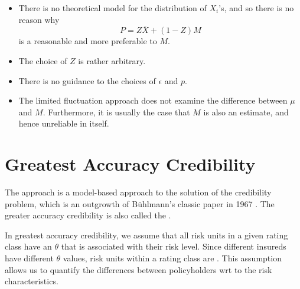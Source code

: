 \documentclass[notoc,notitlepage]{tufte-book}
\begin{document}
\begin{itemize}
  \item There is no theoretical model for the distribution of $X_i$'s, and so
    there is no reason why
    \begin{equation*}
      P = Z \overline{X} + (1 - Z) M
    \end{equation*}
    is a reasonable and more preferable to $M$.
  \item The choice of $Z$ is rather arbitrary.
  \item There is no guidance to the choices of $\epsilon$ and $p$.
  \item The limited fluctuation approach does not examine the difference between
    $\mu$ and $M$. Furthermore, it is usually the case that $M$ is also an
    estimate, and hence unreliable in itself.
\end{itemize}



\chapter{Greatest Accuracy Credibility}%
\label{chp:greatest_accuracy_credibility}

The  approach is a model-based approach to
the solution of the credibility problem, which is an outgrowth of B\"{u}hlmann's
classic paper in 1967 \cite{buhlmann1967}. The greater accuracy credibility is
also called the .

In greatest accuracy credibility, we assume that all risk units in a given
rating class have an  $\theta$ that is
associated with their risk level. Since different insureds have different
$\theta$ values, risk units within a rating class are . This assumption allows us to quantify the differences between
policyholders wrt to the risk characteristics.
\end{document}
